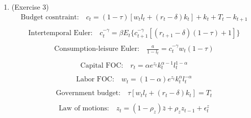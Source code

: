 \documentclass[letterpaper,12pt]{article}
\theoremstyle{definition}
\begin{document}
\begin{enumerate}
	\item(Exercise 3)\\
	\begin{equation} \label{eq1}
	\begin{split}
	\text{Budget cosntraint:} \quad c_{t} = (1 - \tau)[w_{t}l_{t} + (r_{t} - \delta)k_{t}] + k_{t} + T_{t} - k_{t + 1}\\
	\end{split}
	\end{equation}
	\begin{equation} \label{eq2}
	\begin{split}
	\text{Intertemporal Euler:} \quad c_{t}^{-\gamma} = \beta E_{t}\{  c_{t + 1}^{-\gamma}[(r_{t + 1} - \delta)(1 - \tau) + 1]\} \\
	\end{split}
	\end{equation}
	\begin{equation} \label{eq3}
	\begin{split}
	\text{Consumption-leisure Euler:} \quad \frac{a}{1 - l_{t}} = c_{t}^{-\gamma}w_{t}(1 - \tau)\\
	\end{split}
	\end{equation}
	\begin{equation} \label{eq4}
	\begin{split}
	\text{Capital FOC:} \quad r_{t} = \alpha e^{z_{t}} k_{t}^{\alpha - 1} l_{t}^{1 - \alpha} \\
	\end{split}
	\end{equation}
	\begin{equation} \label{eq5}
	\begin{split}
	\text{Labor FOC:} \quad w_{t} = (1 - \alpha) e^{z_{t}} k_{t}^{\alpha } l_{t}^{ - \alpha} \\
	\end{split}
	\end{equation}
	\begin{equation} \label{eq6}
	\begin{split}
	\text{Government budget:} \quad \tau[w_{t}l_{t} + (r_{t} - \delta)k_{t}] = T_{t}  \\
	\end{split}
	\end{equation}
	\begin{equation} \label{eq7}
	\begin{split}
	\text{Law of motions:} \quad z_{t} = (1 - \rho_{z})\bar{z} + \rho_{z}z_{t - 1} + \epsilon_{t}^{z} \\
	\end{split}
	\end{equation}		


\end{enumerate}
\end{document}
